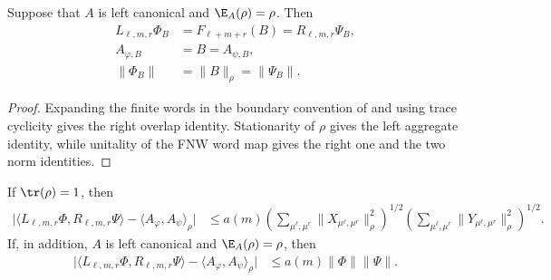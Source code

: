 \begin{lemma}
    \label{thm:fnw_full_ground_spectator_identities}
    \leanok
    Suppose that $A$ is left canonical and $\E_A(\rho)=\rho$. Then
    \begin{align}
        L_{\ell,m,r}\Phi_B
                           & =F_{\ell+m+r}(B)
        =R_{\ell,m,r}\Psi_B,
        \label{eq:fnw_full_ground_overlap_identities}   \\
        A_{\varphi,B}      & =B=A_{\psi,B},
        \label{eq:fnw_full_ground_aggregate_identities} \\
        \lVert\Phi_B\rVert & =\lVert B\rVert_\rho
        =\lVert\Psi_B\rVert.
        \label{eq:fnw_full_ground_family_norms}
    \end{align}
\end{lemma}

\begin{proof}
    \leanok
    Expanding the finite words in the boundary convention of
    \cite[Equations~(5.5) and~(5.8)]{Fannes1992Finitely} and using trace
    cyclicity gives the right overlap identity. Stationarity of $\rho$ gives
    the left aggregate identity, while unitality of the FNW word map gives the
    right one and the two norm identities.
\end{proof}

\begin{lemma}
    \label{thm:fnw_overlap_linear_family_estimate}
    \leanok
    If $\tr(\rho)=1$, then
    \begin{align}
        \bigl|\langle L_{\ell,m,r}\Phi,R_{\ell,m,r}\Psi\rangle
        -\langle A_\varphi,A_\psi\rangle_\rho\bigr|
         & \leq a(m)
        \left(\sum_{\mu^\ell,\mu^r}\lVert X_{\mu^\ell,\mu^r}\rVert_\rho^2\right)^{1/2}
        \left(\sum_{\mu^\ell,\mu^r}\lVert Y_{\mu^\ell,\mu^r}\rVert_\rho^2\right)^{1/2}.
        \label{eq:fnw_overlap_termwise_estimate}
    \end{align}
    If, in addition, $A$ is left canonical and $\E_A(\rho)=\rho$, then
    \begin{align}
        \bigl|\langle L_{\ell,m,r}\Phi,R_{\ell,m,r}\Psi\rangle
        -\langle A_\varphi,A_\psi\rangle_\rho\bigr|
         & \leq a(m)\lVert\Phi\rVert\lVert\Psi\rVert.
        \label{eq:fnw_overlap_linear_family_estimate}
    \end{align}
\end{lemma}

